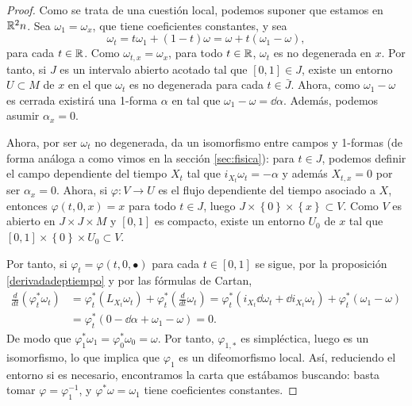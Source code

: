 \begin{proof}
  Como se trata de una cuestión local, podemos suponer que estamos en $\mathbb{R}^2n$.
  Sea $\omega_1=\omega_x$, que tiene coeficientes constantes, y sea
  \begin{equation*}
    \omega_t=t\omega_1 + (1-t) \omega = \omega + t(\omega_1-\omega),
  \end{equation*}
  para cada $t\in \mathbb{R}$. Como $\omega_{t,x}=\omega_x$, para todo $t \in \mathbb{R}$, $\omega_t$ es no degenerada en $x$. Por tanto, si $J$ es un intervalo abierto acotado tal que $[0,1]\in J$, existe un entorno $U \subset M$ de $x$ en el que $\omega_t$ es no degenerada para cada $t\in \bar{J}$.
  Ahora, como $\omega_1-\omega$ es cerrada existirá una 1-forma $\alpha$ en tal que $\omega_1-\omega=\dd \alpha$. Además, podemos asumir $\alpha_x=0$.

  Ahora, por ser $\omega_t$ no degenerada, da un isomorfismo entre campos y 1-formas (de forma análoga a como vimos en la sección \ref{sec:fisica}): para $t \in J$, podemos definir el campo dependiente del tiempo $X_t$ tal que $i_{X_t}\omega_t= - \alpha$ y además $X_{t,x}=0$ por ser $\alpha_x=0$. Ahora, si $\varphi:V\rightarrow U$ es el flujo dependiente del tiempo asociado a $X$, entonces $\varphi(t,0,x)=x$ para todo $t\in J$, luego $J\times \left\{ 0 \right\}\times \left\{ x \right\} \subset V$. Como $V$ es abierto en $J\times J\times M$ y $[0,1]$ es compacto, existe un entorno $U_0$ de $x$  tal que $[0,1]\times \left\{ 0 \right\}\times U_0 \subset V$. 
  
  Por tanto, si $\varphi_t = \varphi(t,0,\bullet)$ para cada $t\in [0,1]$ se sigue, por la proposición \ref{derivadadeptiempo} y por las fórmulas de Cartan,
  \begin{align*}
    \frac{d}{dt}(\varphi_t^*\omega_t) & = \varphi_t^* (L_{X_t}\omega_t) + \varphi_t^* \left( \frac{d}{dt}\omega_t \right) = \varphi_t^* (i_{X_t}\dd \omega_t+\dd i_{X_t}\omega_t)+\varphi_t^*(\omega_1-\omega) \\
    & = \varphi_t^*(0-\dd \alpha + \omega_1 - \omega) = 0.
  \end{align*}
  De modo que $\varphi_1^*\omega_1=\varphi_0^*\omega_0=\omega$. Por tanto, $\varphi_{1,*}$ es simpléctica, luego es un isomorfismo, lo que implica que $\varphi_1$ es un difeomorfismo local. Así, reduciendo el entorno si es necesario, encontramos la carta que estábamos buscando: basta tomar $\varphi=\varphi_1^{-1}$, y $\varphi^*\omega=\omega_1$ tiene coeficientes constantes.
\end{proof}

